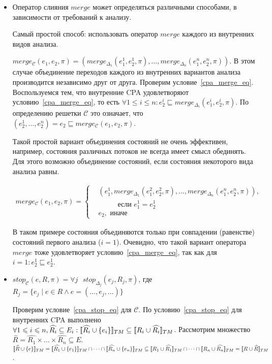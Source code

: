 \begin{itemize}
\item 
Оператор слияния $merge$ может определяться различными способами, в зависимости от требований к анализу.

Самый простой способ: использовать оператор $merge$ каждого из внутренних видов анализа.

$merge_{\mathscr{C}}(e_1,e_2,\pi) = (merge_{\Delta_1}(e_1^1, e_2^1,\pi), \dots, merge_{\Delta_n}(e_1^n, e_2^n,\pi))$.
В этом случае объединение переходов каждого из внутренних вариантов анализа производится независимо друг от друга.
Проверим условие~\ref{cpa_merge_eq}.
Воспользуемся тем, что внутренние CPA удовлетворяют условию~\ref{cpa_merge_eq}, то есть $\forall 1 \le i \le n: e_2^i \sqsubseteq merge_{\Delta_i}(e_1^i, e_2^i,\pi)$.
По определению решетки $\mathscr{C}$ это означает, что $(e_2^1, \dots, e_2^n) = e_2 \sqsubseteq merge_{\mathscr{C}}(e_1,e_2,\pi)$.

Такой простой вариант объединения состояний не очень эффективен, например, состояния различных потоков не всегда имеет смысл обединять.
Для этого возможно объединение состояний, если состояния некоторого вида анализа равны. 

\begin{align*}
merge_{\mathscr{C}}(e_1,e_2,\pi) =
\begin{cases}
&(e_1^1, merge_{\Delta_1}(e_1^2, e_2^2,\pi), \dots, merge_{\Delta_n}(e_1^n, e_2^n,\pi)), \\
& \hspace{1cm} \mbox{ если } e_1^1 = e_2^1 \\
& e_2, \mbox{ иначе }
\end{cases} 
\end{align*}

В таком примере состояния объединяются только при совпадении (равенстве) состояний первого анализа ($i=1$).
Очевидно, что такой вариант оператора $merge$ тоже удовлетворяет условию~\ref{cpa_merge_eq}, так как для $i = 1: e_2^1 \sqsubseteq e_2^1$.

\item 
$stop_{\mathscr{C}}(e,R,\pi)=\forall j \mbox{ } stop_{\Delta_j}(e_j, R_j, \pi)$, где $R_j = \{e_j \mid e \in R \land e = (\dots, e_j, \dots)\}$

Проверим условие~\ref{cpa_stop_eq} для $\mathscr{C}$.
По условию~\ref{cpa_stop_eq} для внутренних CPA выполнено $\forall 1 \leqslant i \leqslant n, \widehat{R_i} \subseteq E_i: [\![ \widehat{R_i} \cup \{e_i\} ]\!]_{TM} \subseteq [\![ R_i \cup \widehat{R_i} ]\!]_{TM}$.
Рассмотрим множество $\widehat{R} = \widehat{R_1} \times \dots \times \widehat{R_n} \subseteq E$. 
$\conc{\widehat{R} \cup \{e\}}_{TM} = \conc{\widehat{R_1} \cup \{e_1\}}_{TM} \cap \dots \cap \conc{\widehat{R_n} \cup \{e_n\}}_{TM} \subseteq \conc{R_1 \cup \widehat{R_1}}_{TM} \cap \dots \cap \conc{R_n \cup \widehat{R_n}}_{TM} = \conc{R \cup \widehat{R}}_{TM}$.


\end{itemize}
